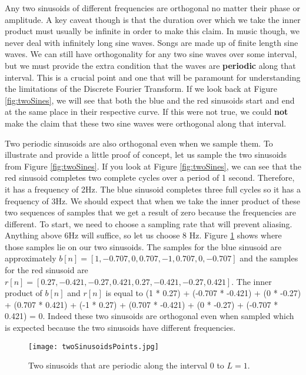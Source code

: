 Any two sinusoids of different frequencies are orthogonal no matter their phase or amplitude.  A key caveat though
is that the duration over which we take the inner product must usually be infinite in order to make this claim.  In 
music though, we never deal with infinitely long sine waves.  Songs are made up of finite length sine waves.  We
can still have orthogonality for any two sine waves over some interval, but we must provide
the extra condition that the waves are \textbf{periodic} along that interval.  This is a crucial point and one that 
will be paramount for 
understanding the limitations of the Discrete Fourier Transform.  If we look back at Figure \ref{fig:twoSines}, 
we will see that 
both the blue and the red sinusoids start and end at the same place in their respective curve.  If this were not true,
we could \textbf{not} make the claim that these two sine waves were orthogonal along that interval.  

Two periodic sinusoids are also orthogonal even when we sample them.  To illustrate and provide a little proof of concept, let us sample the
two sinusoids from Figure \ref{fig:twoSines}.  If you look at Figure \ref{fig:twoSines}, we can see that the red sinusoid
completes two complete cycles over a period of 1 second.  Therefore, it has a frequency of 2Hz.  The blue sinusoid
completes three full cycles so it has a frequency of 3Hz.  We should expect that when we take the inner product
of these two sequences of samples that we get a result of zero because the frequencies are different.  
To start, we need to choose a sampling rate that will prevent aliasing.  Anything above 6Hz will suffice, so let us choose 8 Hz.  Figure \ref{fig:twoSinesPoints} shows 
where those samples lie on our two sinusoids.  The samples for the blue sinusoid are approximately $b[n] = [1, -0.707, 0, 0.707, -1, 0.707, 0, -0.707]$ and the samples for the red
sinusoid are $r[n] = [0.27, -0.421, -0.27, 0.421, 0.27, -0.421, -0.27, 0.421]$.  The inner
product of $b[n]$ and $r[n]$ is equal to (1 * 0.27) + (-0.707 * -0.421) + (0 * -0.27) + 
(0.707 * 0.421) + (-1 * 0.27) + (0.707 * -0.421) + (0 * -0.27) + (-0.707 * 0.421) = 0.  Indeed these two sinusoids are orthogonal even when sampled which is expected because the two sinusoids have different frequencies.

\begin{figure}[h]
	\caption{Two sinusoids that are periodic along the interval 0 to $L = 1$.}
	\centering
	\texttt{[image: twoSinusoidsPoints.jpg]}
	\label{fig:twoSinesPoints}
\end{figure}

